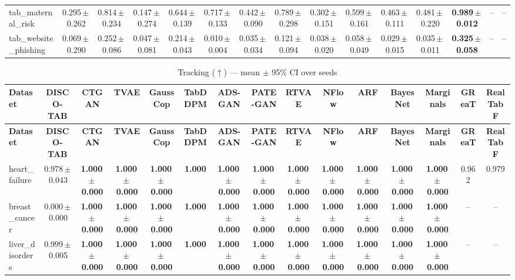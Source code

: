 \documentclass[8pt]{extarticle}
\begin{document}
\begin{longtable}{l*{14}{c}}
tab\_maternal\_risk & 0.295\,$\pm$\,0.262 & 0.814\,$\pm$\,0.234 & 0.147\,$\pm$\,0.274 & 0.644\,$\pm$\,0.139 & 0.717\,$\pm$\,0.133 & 0.442\,$\pm$\,0.090 & 0.789\,$\pm$\,0.298 & 0.302\,$\pm$\,0.151 & 0.599\,$\pm$\,0.161 & 0.463\,$\pm$\,0.111 & 0.481\,$\pm$\,0.220 & \textbf{0.989\,$\pm$\,0.012} & -- & -- \\
tab\_website\_phishing & 0.069\,$\pm$\,0.290 & 0.252\,$\pm$\,0.086 & 0.047\,$\pm$\,0.081 & 0.214\,$\pm$\,0.043 & 0.010\,$\pm$\,0.004 & 0.035\,$\pm$\,0.034 & 0.121\,$\pm$\,0.094 & 0.038\,$\pm$\,0.020 & 0.058\,$\pm$\,0.049 & 0.029\,$\pm$\,0.015 & 0.035\,$\pm$\,0.011 & \textbf{0.325\,$\pm$\,0.058} & -- & -- \\
\end{longtable}
\begin{longtable}{l*{14}{c}}
\caption{Tracking ($\uparrow$) --- mean $\pm$ 95\% CI over seeds}\\
\toprule
\textbf{Dataset} & \textbf{DISCO-TAB} & \textbf{CTGAN} & \textbf{TVAE} & \textbf{GaussCop} & \textbf{TabDDPM} & \textbf{ADS-GAN} & \textbf{PATE-GAN} & \textbf{RTVAE} & \textbf{NFlow} & \textbf{ARF} & \textbf{BayesNet} & \textbf{Marginals} & \textbf{GReaT} & \textbf{RealTabF} \\
\midrule
\endfirsthead
\toprule
\textbf{Dataset} & \textbf{DISCO-TAB} & \textbf{CTGAN} & \textbf{TVAE} & \textbf{GaussCop} & \textbf{TabDDPM} & \textbf{ADS-GAN} & \textbf{PATE-GAN} & \textbf{RTVAE} & \textbf{NFlow} & \textbf{ARF} & \textbf{BayesNet} & \textbf{Marginals} & \textbf{GReaT} & \textbf{RealTabF} \\
\midrule
\endhead
\bottomrule
\endfoot
heart\_failure & 0.978\,$\pm$\,0.043 & \textbf{1.000\,$\pm$\,0.000} & \textbf{1.000\,$\pm$\,0.000} & \textbf{1.000\,$\pm$\,0.000} & \textbf{1.000} & \textbf{1.000\,$\pm$\,0.000} & \textbf{1.000\,$\pm$\,0.000} & \textbf{1.000\,$\pm$\,0.000} & \textbf{1.000\,$\pm$\,0.000} & \textbf{1.000\,$\pm$\,0.000} & \textbf{1.000\,$\pm$\,0.000} & \textbf{1.000\,$\pm$\,0.000} & 0.962 & 0.979 \\
breast\_cancer & 0.000\,$\pm$\,0.000 & \textbf{1.000\,$\pm$\,0.000} & \textbf{1.000\,$\pm$\,0.000} & \textbf{1.000\,$\pm$\,0.000} & \textbf{1.000} & \textbf{1.000\,$\pm$\,0.000} & \textbf{1.000\,$\pm$\,0.000} & \textbf{1.000\,$\pm$\,0.000} & \textbf{1.000\,$\pm$\,0.000} & \textbf{1.000\,$\pm$\,0.000} & \textbf{1.000\,$\pm$\,0.000} & \textbf{1.000\,$\pm$\,0.000} & -- & -- \\
liver\_disorders & 0.999\,$\pm$\,0.005 & \textbf{1.000\,$\pm$\,0.000} & \textbf{1.000\,$\pm$\,0.000} & \textbf{1.000\,$\pm$\,0.000} & \textbf{1.000} & \textbf{1.000\,$\pm$\,0.000} & \textbf{1.000\,$\pm$\,0.000} & \textbf{1.000\,$\pm$\,0.000} & \textbf{1.000\,$\pm$\,0.000} & \textbf{1.000\,$\pm$\,0.000} & \textbf{1.000\,$\pm$\,0.000} & \textbf{1.000\,$\pm$\,0.000} & -- & -- \\

\end{longtable}
\end{document}
